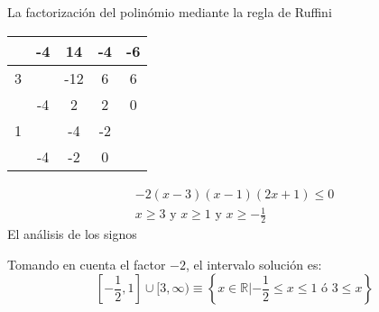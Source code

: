\documentclass[a4 paper]{article}
\begin{document}
        \begin{paracol}{2}
        	La factorización del polinómio mediante la regla de Ruffini
        	\begin{table}[ht]
        		\centering
                \begin{tabular}{c|cccc}
                		&	-4	&	14	&	-4	&	-6 \\
                    \hline
                    3	&		&	-12	&	6	&	6 \\
                    	&	-4	&	2	&	2	&	0 \\
                    \hline
                    1	&		&	-4	&	-2	& \\
                    	&	-4	&	-2	&	0	&
                \end{tabular}
        	\end{table}
            \begin{gather*}
            	-2(x - 3)(x - 1)(2x + 1) \leq 0 \\
                x \geq 3 \text{ y } x \geq 1 \text{ y } x \geq -\tfrac{1}{2}
            \end{gather*}
            \switchcolumn
            El análisis de los signos
            \begin{figure}[ht]
            	\centering
            \end{figure}
            
            Tomando en cuenta el factor $-2$, el intervalo solución es:
            \[
            	\left[-\frac{1}{2}, 1\right] \cup [3, \infty) \equiv \left\{x \in \mathbb{R} | -\frac{1}{2} \leq x \leq 1 \text{ ó } 3 \leq x\right\}
            \]
        \end{paracol}
\end{document}
